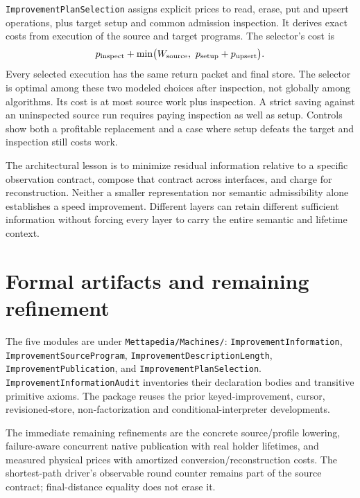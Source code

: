 \documentclass[11pt,a4paper]{article}
\newcommand{\code}[1]{\nolinkurl{#1}}
\begin{document}
\code{ImprovementPlanSelection} assigns explicit prices to read, erase, put
and upsert operations, plus target setup and common admission inspection.
It derives exact costs from execution of the source and target programs.
The selector's cost is
\[
 p_{\rm inspect}+\min\bigl(W_{\rm source},\ p_{\rm setup}+p_{\rm upsert}\bigr).
\]
Every selected execution has the same return packet and final store. The
selector is optimal among these two modeled choices after inspection, not
globally among algorithms. Its cost is at most source work plus inspection.
A strict saving against an uninspected source run requires paying inspection
as well as setup. Controls show both a profitable replacement and a case where
setup defeats the target and inspection still costs work.

The architectural lesson is to minimize residual information relative to a
specific observation contract, compose that contract across interfaces, and
charge for reconstruction. Neither a smaller representation nor semantic
admissibility alone establishes a speed improvement. Different layers can
retain different sufficient information without forcing every layer to carry
the entire semantic and lifetime context.

\section{Formal artifacts and remaining refinement}

The five modules are under \code{Mettapedia/Machines/}:
\code{ImprovementInformation}, \code{ImprovementSourceProgram},
\code{ImprovementDescriptionLength}, \code{ImprovementPublication}, and
\code{ImprovementPlanSelection}. \code{ImprovementInformationAudit} inventories
their declaration bodies and transitive primitive axioms. The package reuses
the prior keyed-improvement, cursor, revisioned-store, non-factorization and
conditional-interpreter developments.

The immediate remaining refinements are the concrete source/profile lowering,
failure-aware concurrent native publication with real holder lifetimes, and
measured physical prices with amortized conversion/reconstruction costs. The
shortest-path driver's observable round counter remains part of the source
contract; final-distance equality does not erase it.
\end{document}
